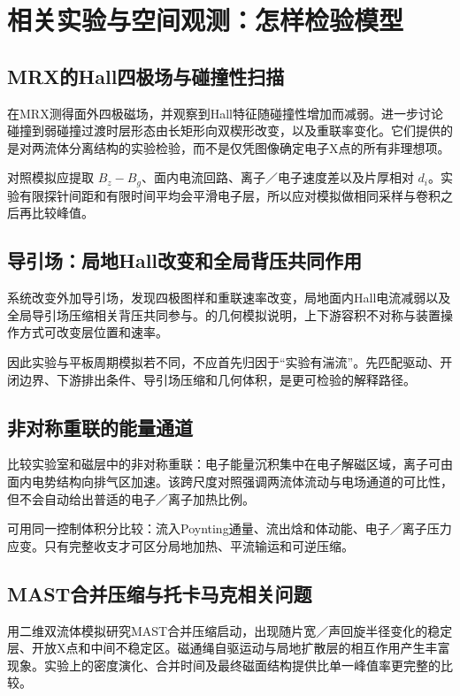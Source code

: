 \chapter{相关实验与空间观测：怎样检验模型}
\section{MRX的Hall四极场与碰撞性扫描}
\citet{Ren2005}在MRX测得面外四极磁场，并观察到Hall特征随碰撞性增加而减弱。\citet{Yamada2006}进一步讨论碰撞到弱碰撞过渡时层形态由长矩形向双楔形改变，以及重联率变化。它们提供的是对两流体分离结构的实验检验，而不是仅凭图像确定电子X点的所有非理想项。

对照模拟应提取 $B_z-B_g$、面内电流回路、离子／电子速度差以及片厚相对 $d_i$。实验有限探针间距和有限时间平均会平滑电子层，所以应对模拟做相同采样与卷积之后再比较峰值。

\section{导引场：局地Hall改变和全局背压共同作用}
\citet{GuideExp2012}系统改变外加导引场，发现四极图样和重联速率改变，局地面内Hall电流减弱以及全局导引场压缩相关背压共同参与。\citet{Dorfman2008}的几何模拟说明，上下游容积不对称与装置操作方式可改变层位置和速率。

因此实验与平板周期模拟若不同，不应首先归因于“实验有湍流”。先匹配驱动、开闭边界、下游排出条件、导引场压缩和几何体积，是更可检验的解释路径。

\section{非对称重联的能量通道}
\citet{Yoo2018}比较实验室和磁层中的非对称重联：电子能量沉积集中在电子解磁区域，离子可由面内电势结构向排气区加速。该跨尺度对照强调两流体流动与电场通道的可比性，但不会自动给出普适的电子／离子加热比例。

可用同一控制体积分比较：流入Poynting通量、流出焓和体动能、电子／离子压力应变。只有完整收支才可区分局地加热、平流输运和可逆压缩。

\section{MAST合并压缩与托卡马克相关问题}
\citet{Stanier2013}用二维双流体模拟研究MAST合并压缩启动，出现随片宽／声回旋半径变化的稳定层、开放X点和中间不稳定区。磁通绳自驱运动与局地扩散层的相互作用产生丰富现象。实验上的密度演化、合并时间及最终磁面结构提供比单一峰值率更完整的比较。

